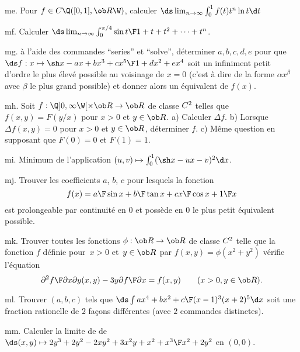 \exo [Level=2,Fight=2,Learn=1,Type=\Exercices,Field=\IntégralesGénéralisées,Origin=] me. 
Pour $f\in\sc C\Q([0,1],\ob R\W)$, calculer $\ds \lim_{n\to\infty}\int_0^1f(t)t^n\ln t\d t$

\exo [Level=2,Fight=2,Learn=1,Type=\Exercices,Field=\IntégralesGénéralisées,Origin=] mf. 
Calculer $\ds\lim_{n\to\infty}\int_0^{\pi/4}{\sin t\F 1+t+t^2+\cdots+t^n}$. 

\exo [Level=1,Fight=1,Learn=1,Type=\Maple,Field=\DéveloppementsLimités,Origin=] mg. 
à l'aide des commandes ``series'' et ``solve'', déterminer $a,b,c,d,e$ pour que $\ds f:x\mapsto\sh x-{ax+bx^3+cx^5\F1+dx^2+ex^4}$ soit un infiniment petit 
d'ordre le plus élevé possible au voisinage de $x=0$ (c'est à dire de la forme $\alpha x^\beta$ avec $\beta$ le plus grand possible) 
et donner alors un équivalent de $f(x)$. 

\exo [Level=2,Fight=2,Learn=1,Type=\Exercices,Field=\FonctionsDePlusieursVariables,Origin=] mh. 
Soit $f:\Q]0,\infty\W[\times\ob R\to\ob R$ de classe $\sc C^2$ 
telles que $f(x,y)=F(y/x)$ pour $x>0$ et $y\in\ob R$. \pn
a) Calculer $\Delta f$. \pn
b) Lorsque $\Delta f(x,y)=0$ pour $x>0$ et $y\in\ob R$, déterminer $f$. \pn
c) Même question en supposant que $F(0)=0$ et $F(1)=1$. 

\exo [Level=2,Fight=2,Learn=1,Type=\Exercices,Field=\Orthonormalisation,Origin=] mi. 
Minimum de l'application $(u,v)\mapsto\int_0^1(\sh x-ux-v)^2\d x$. 

\exo [Level=1,Fight=1,Learn=1,Type=\Maple,Field=\DéveloppementsLimités,Origin=] mj. 
Trouver les coefficients $a$, $b$, $c$ pour lesquels la fonction 
$$
f(x)={a\F\sin x}+{b\F\tan x}+{cx\F\cos x}+{1\F x}
$$ 
est prolongeable par continuité en $0$ et possède en $0$ le plus petit équivalent possible. 

\exo [Level=2,Fight=2,Learn=1,Type=\Exercices,Field=\FonctionsDePlusieursVariables,Origin=] mk. 
Trouver toutes les fonctions $\phi:\ob R\to\ob R$ de classe $\sc C^2$ telle que la fonction $f$ 
définie pour~$x>0$ et~$y\in\ob R$ par $f(x,y)=\phi(x^2+y^2)$ vérifie l'équation 
$$
{\partial^2f\F\partial x\partial y}(x,y)-3y{\partial f\F\partial x}=f(x,y)\qquad(x>0,y\in\ob R). 
$$

\exo [Level=1,Fight=1,Learn=1,Type=\Maple,Field=\Intégrales,Origin=] ml. 
Trouver $(a,b,c)$ tels que $\ds \int{ax^4+bx^2+c\F(x-1)^3(x+2)^5}\d x$ 
soit une fraction rationelle de $2$ fa\c cons différentes (avec $2$ commandes distinctes). 

\exo [Level=2,Fight=1,Learn=0,Type=\Exercices,Field=\FonctionsDePlusieursVariables,Origin=] mm. 
Calculer la limite de  de $\ds (x,y)\mapsto {2y^3+2y^2-2xy^2+3x^2y+x^2+x^3\F x^2+2y^2}$ en $(0,0)$. 

